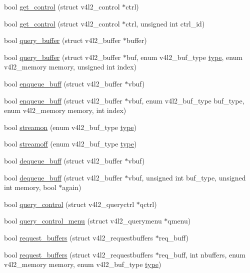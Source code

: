 \begin{DoxyCompactItemize}
\item 
bool \hyperlink{classv4ldev_a8b7c5ca137d864c8ffe32349b0aeb01a}{get\+\_\+control} (struct v4l2\+\_\+control $\ast$ctrl)
\item 
bool \hyperlink{classv4ldev_a3244e54e71d070f383bcf3272a588e17}{get\+\_\+control} (struct v4l2\+\_\+control $\ast$ctrl, unsigned int ctrl\+\_\+id)
\item 
bool \hyperlink{classv4ldev_a9e4d9ea82e59a99286f4cea51cc08685}{query\+\_\+buffer} (struct v4l2\+\_\+buffer $\ast$buffer)
\item 
bool \hyperlink{classv4ldev_ab5b21c7fd5893d82039fd25c6450532c}{query\+\_\+buffer} (struct v4l2\+\_\+buffer $\ast$buf, enum v4l2\+\_\+buf\+\_\+type \hyperlink{classstd_1_1conditional_1_1type}{type}, enum v4l2\+\_\+memory memory, unsigned int index)
\item 
bool \hyperlink{classv4ldev_ae53ad5fcd680c9df8e7f2f564e575a35}{enqueue\+\_\+buff} (struct v4l2\+\_\+buffer $\ast$vbuf)
\item 
bool \hyperlink{classv4ldev_a4785a96e636f1dea81d2d64ec0c36d5a}{enqueue\+\_\+buff} (struct v4l2\+\_\+buffer $\ast$vbuf, enum v4l2\+\_\+buf\+\_\+type buf\+\_\+type, enum v4l2\+\_\+memory memory, int index)
\item 
bool \hyperlink{classv4ldev_a930d11206b595e7f27c7ca240ce332f4}{streamon} (enum v4l2\+\_\+buf\+\_\+type \hyperlink{classstd_1_1conditional_1_1type}{type})
\item 
bool \hyperlink{classv4ldev_a969a8c970864242b50f0532ebc38e900}{streamoff} (enum v4l2\+\_\+buf\+\_\+type \hyperlink{classstd_1_1conditional_1_1type}{type})
\item 
bool \hyperlink{classv4ldev_a539e3edba551564e19bd1ae21c0cdb26}{dequeue\+\_\+buff} (struct v4l2\+\_\+buffer $\ast$vbuf)
\item 
bool \hyperlink{classv4ldev_a699e44c1d314c6a77ad9afc4b6a89078}{dequeue\+\_\+buff} (struct v4l2\+\_\+buffer $\ast$vbuf, unsigned int buf\+\_\+type, unsigned int memory, bool $\ast$again)
\item 
bool \hyperlink{classv4ldev_a99fbec860c69f6132154871816aff128}{query\+\_\+control} (struct v4l2\+\_\+queryctrl $\ast$qctrl)
\item 
bool \hyperlink{classv4ldev_a95b39e9759d93a2c55dd031ed2ef93c1}{query\+\_\+control\+\_\+menu} (struct v4l2\+\_\+querymenu $\ast$qmenu)
\item 
bool \hyperlink{classv4ldev_a432cce3442cbc7d5cf7b295073b4ef0a}{request\+\_\+buffers} (struct v4l2\+\_\+requestbuffers $\ast$req\+\_\+buff)
\item 
bool \hyperlink{classv4ldev_a73eafcdc186c7e7e2db2596da1b37e36}{request\+\_\+buffers} (struct v4l2\+\_\+requestbuffers $\ast$req\+\_\+buff, int nbuffers, enum v4l2\+\_\+memory memory, enum v4l2\+\_\+buf\+\_\+type \hyperlink{classstd_1_1conditional_1_1type}{type})
\end{DoxyCompactItemize}
